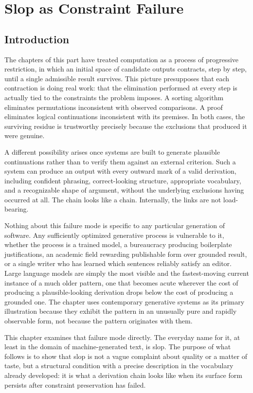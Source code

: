 \documentclass[11pt,oneside]{book}
\theoremstyle{plain}
\theoremstyle{definition}
\theoremstyle{remark}
\begin{document}
\chapter{Slop as Constraint Failure}

\section{Introduction}

The chapters of this part have treated computation as a process of progressive restriction, in which an initial space of candidate outputs contracts, step by step, until a single admissible result survives. This picture presupposes that each contraction is doing real work: that the elimination performed at every step is actually tied to the constraints the problem imposes. A sorting algorithm eliminates permutations inconsistent with observed comparisons. A proof eliminates logical continuations inconsistent with its premises. In both cases, the surviving residue is trustworthy precisely because the exclusions that produced it were genuine.

A different possibility arises once systems are built to generate plausible continuations rather than to verify them against an external criterion. Such a system can produce an output with every outward mark of a valid derivation, including confident phrasing, correct-looking structure, appropriate vocabulary, and a recognizable shape of argument, without the underlying exclusions having occurred at all. The chain looks like a chain. Internally, the links are not load-bearing.

Nothing about this failure mode is specific to any particular generation of software. Any sufficiently optimized generative process is vulnerable to it, whether the process is a trained model, a bureaucracy producing boilerplate justifications, an academic field rewarding publishable form over grounded result, or a single writer who has learned which sentences reliably satisfy an editor. Large language models are simply the most visible and the fastest-moving current instance of a much older pattern, one that becomes acute wherever the cost of producing a plausible-looking derivation drops below the cost of producing a grounded one. The chapter uses contemporary generative systems as its primary illustration because they exhibit the pattern in an unusually pure and rapidly observable form, not because the pattern originates with them.

This chapter examines that failure mode directly. The everyday name for it, at least in the domain of machine-generated text, is slop. The purpose of what follows is to show that slop is not a vague complaint about quality or a matter of taste, but a structural condition with a precise description in the vocabulary already developed: it is what a derivation chain looks like when its surface form persists after constraint preservation has failed.
\end{document}
